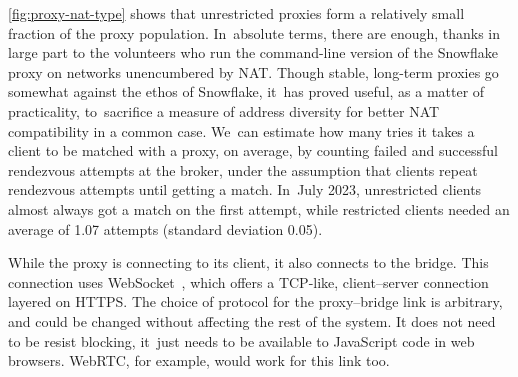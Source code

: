 \documentclass[letterpaper,twocolumn]{article}
\begin{document}
\autoref{fig:proxy-nat-type}
shows that unrestricted proxies form
a relatively small fraction of the proxy population.
In~absolute terms, there are enough,
thanks in large part to the volunteers who run
the command-line
version of the Snowflake proxy
on networks unencumbered by NAT.
Though stable, long-term proxies go
somewhat against the ethos of Snowflake,
it~has proved useful, as a matter of practicality,
to~sacrifice a measure of address diversity
for better NAT compatibility in a common case.
We~can estimate how many tries it takes a client
to be matched with a proxy, on average,
by counting failed and successful rendezvous attempts at the broker,
under the assumption that clients repeat rendezvous attempts
until getting a match.
In~July 2023,
unrestricted clients almost always got a match on the first attempt,
while restricted clients needed an average of
1.07 attempts (standard deviation 0.05).

While the proxy is connecting to its client,
it also connects to the bridge.
This connection
uses WebSocket~\cite{rfc6455}, which
offers a TCP-like, client--server connection
layered on HTTPS.
The choice of protocol for the proxy--bridge link is arbitrary,
and could be changed
without affecting the rest of the system.
It does not need to be resist blocking,
it~just needs to be available to JavaScript code in web browsers.
WebRTC, for example, would work for this link too.
\end{document}
